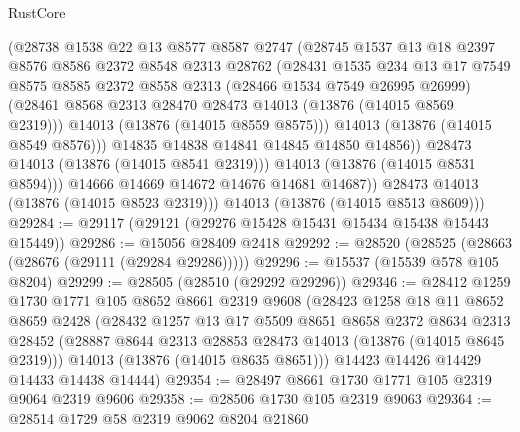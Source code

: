 \begin{lexlean}{RustCore}
\begin{coremodule}
                  (@28738
                    @1538
                    @22
                    @13
                    @8577
                    @8587
                    @2747
                    (@28745
                      @1537
                      @13
                      @18
                      @2397
                      @8576
                      @8586
                      @2372
                      @8548
                      @2313
                      @28762
                      (@28431
                        @1535
                        @234
                        @13
                        @17
                        @7549
                        @8575
                        @8585
                        @2372
                        @8558
                        @2313
                        (@28466 @1534 @7549 @26995 @26999)
                        (@28461 @8568 @2313 @28470 @28473 @14013 (@13876 (@14015 @8569 @2319)))
                        @14013
                        (@13876 (@14015 @8559 @8575)))
                      @14013
                      (@13876 (@14015 @8549 @8576)))
                    @14835
                    @14838
                    @14841
                    @14845
                    @14850
                    @14856))
                @28473
                @14013
                (@13876 (@14015 @8541 @2319)))
              @14013
              (@13876 (@14015 @8531 @8594)))
            @14666
            @14669
            @14672
            @14676
            @14681
            @14687))
        @28473
        @14013
        (@13876 (@14015 @8523 @2319)))
      @14013
      (@13876 (@14015 @8513 @8609)))
@29284 := @29117 (@29121 (@29276 @15428 @15431 @15434 @15438 @15443 @15449))
@29286 := @15056 @28409 @2418
@29292 := @28520 (@28525 (@28663 (@28676 (@29111 (@29284 @29286)))))
@29296 := @15537 (@15539 @578 @105 @8204)
@29299 := @28505 (@28510 (@29292 @29296))
@29346 := @28412
    @1259
    @1730
    @1771
    @105
    @8652
    @8661
    @2319
    @9608
    (@28423
      @1258
      @18
      @11
      @8652
      @8659
      @2428
      (@28432
        @1257
        @13
        @17
        @5509
        @8651
        @8658
        @2372
        @8634
        @2313
        @28452
        (@28887 @8644 @2313 @28853 @28473 @14013 (@13876 (@14015 @8645 @2319)))
        @14013
        (@13876 (@14015 @8635 @8651)))
      @14423
      @14426
      @14429
      @14433
      @14438
      @14444)
@29354 := @28497 @8661 @1730 @1771 @105 @2319 @9064 @2319 @9606
@29358 := @28506 @1730 @105 @2319 @9063
@29364 := @28514 @1729 @58 @2319 @9062 @8204 @21860

\end{coremodule}
\end{lexlean}
